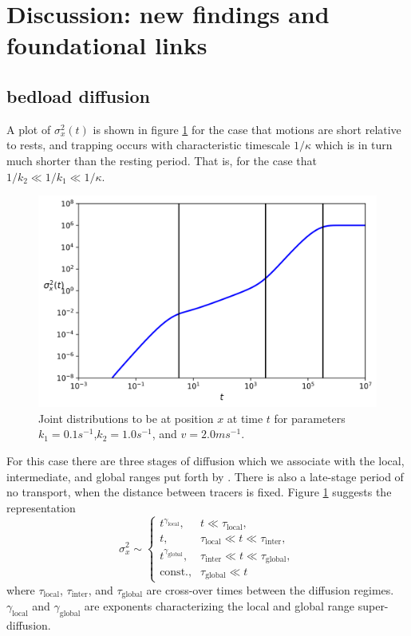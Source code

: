 \documentclass[]{agujournal2018}
\newcommand\be{\begin{equation}}
\newcommand\ee{\end{equation}}
\begin{document}
\section{Discussion: new findings and foundational links}
\label{sec:discussion}

\subsection{bedload diffusion}
A plot of $\sigma_x^2(t)$ is shown in figure \ref{fig:var} for the case that motions are short relative to rests, and trapping occurs with characteristic timescale $1/\kappa$ which is in turn much shorter than the resting period.
That is, for the case that $1/k_2 \ll 1/k_1 \ll 1/\kappa$.
\begin{figure}[t]
	\includegraphics[width=\linewidth,keepaspectratio]{./figures/diffusion.png}
	\caption{Joint distributions to be at position $x$ at time $t$ for parameters $k_1=0.1s^{-1}$,$k_2=1.0s^{-1}$, and $v=2.0ms^{-1}$.}
	\label{fig:var}
\end{figure}
For this case there are three stages of diffusion which we associate with the local, intermediate, and global ranges put forth by \citet{Nikora2001a}. There is also a late-stage period of no transport, when the distance between tracers is fixed.
Figure \ref{fig:var} suggests the representation
\be \sigma_x^2 \sim
\begin{cases}
t^{\gamma_\text{local}}, & t\ll \tau_\text{local},\\
t, & \tau_\text{local} \ll t \ll \tau_\text{inter}, \\
t^{\gamma_\text{global}}, & \tau_\text{inter} \ll t \ll \tau_\text{global}, \\
\text{const.}, & \tau_\text{global} \ll  t
\end{cases}\ee
where $\tau_\text{local}$, $\tau_\text{inter}$, and $\tau_\text{global}$ are cross-over times between the diffusion regimes.
$\gamma_\text{local}$ and $\gamma_\text{global}$ are exponents characterizing the local and global range super-diffusion.
\end{document}

